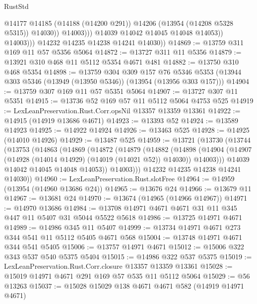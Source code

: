 \begin{lexlean}{RustStd}
\begin{coremodule}
                            @14177
                            @14185
                            (@14188 (@14200 @291))
                            @14206
                            (@13954 (@14208 @5328 @5315))
                            @14030))
                        @14003)))
                  @14039
                  @14042
                  @14045
                  @14048
                  @14053))
              @14003)))
        @14232
        @14235
        @14238
        @14241
        @14030))
@14869 := @13759 @311 @169 @11 @57 @5356 @5064
@14872 := @13727 @311 @11 @5356
@14879 := @13921 @310 @468 @11 @5112 @5354 @4671 @481
@14882 := @13750 @310 @468 @5354
@14898 := @13759
    @304
    @309
    @157
    @76
    @5346
    @5353
    (@13944 @303 @5346 (@13949 (@13950 @5346)) (@13954 (@13956 @303 @157)))
@14904 := @13759 @307 @169 @11 @57 @5351 @5064
@14907 := @13727 @307 @11 @5351
@14915 := @13736 @52 @169 @57 @11 @5112 @5064 @4753 @525
@14919 := LexLeanPreservation.Rust.Corr.opsNil @13357 @13359 @13361
@14922 := @14915 (@14919 @13686 @4671)
@14923 := @13393 @52
@14924 := @13589 @14923
@14925 := @14922 @14924
@14926 := @13463 @525
@14928 := @14925 (@14010 @14926)
@14929 := @13487 @525
@14959 := @13721
    (@13730
      (@13744
        (@13753
          (@14863
            (@14869
              (@14872
                (@14879
                  (@14882
                    (@14898
                      (@14904
                        (@14907 (@14928 (@14014 @14929) (@14019 (@14021 @52)) @14030))
                        @14003)))
                  @14039
                  @14042
                  @14045
                  @14048
                  @14053))
              @14003)))
        @14232
        @14235
        @14238
        @14241
        @14030))
@14960 := LexLeanPreservation.Rust.slotFree
@14964 := @14959 (@13954 (@14960 @13686 @24))
@14965 := @13676 @24
@14966 := @13679 @11
@14967 := @13681 @24
@14970 := @13674 (@14965 (@14966 @14967))
@14971 := @14970 @13686
@14984 := @13708 @14971 @4671 @4671 @31 @11 @345 @447 @11 @5407 @31 @5044 @5522 @5618
@14986 := @13725 @14971 @4671
@14989 := @14986 @345 @11 @5407
@14999 := @13734 @14971 @4671 @273 @344 @541 @11 @5112 @5405 @4671 @568
@15004 := @13748 @14971 @4671 @344 @541 @5405
@15006 := @13757 @14971 @4671
@15012 := @15006 @322 @343 @537 @540 @5375 @5404
@15015 := @14986 @322 @537 @5375
@15019 := LexLeanPreservation.Rust.Corr.closure @13357 @13359 @13361
@15028 := @15019 @14971 @4671 @291 @169 @57 @535 @11 @5112 @5064
@15029 := @56 @13263
@15037 := @15028 @15029 @138 @4671 @4671 @582 (@14919 @14971 @4671)

\end{coremodule}
\end{lexlean}
